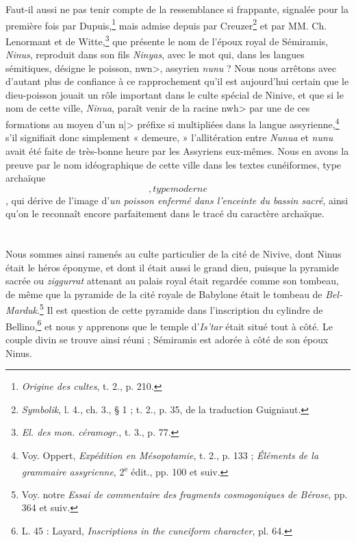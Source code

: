 \documentclass[a4paper, 11pt, oneside]{article}
\newcommand*\svgAAAA{}
\newcommand*\svgAAAB{}
\begin{document}
Faut-il aussi ne pas tenir compte de la ressemblance si frappante, signalée pour la première fois par Dupuis,\footnote{\emph{Origine des cultes}, t. 2., p. 210.} mais admise depuis par Creuzer\footnote{\emph{Symbolik}, l. 4., ch. 3., § 1 ; t. 2., p. 35, de la traduction Guigniaut.} et par MM. Ch. Lenormant et de Witte,\footnote{\emph{El. des mon. céramogr.}, t. 3., p. 77.} que présente le nom de l'époux royal de Sémiramis, \emph{Ninus}, reproduit dans son fils \emph{Ninyas}, avec le mot qui, dans les langues sémitiques, désigne le poisson, \<nwn>, assyrien \emph{nunu} ? Nous nous arrêtons avec d'autant plus de confiance à ce rapprochement qu'il est aujourd'hui certain que le dieu-poisson jouait un rôle important dans le culte spécial de Ninive, et que si le nom de cette ville, \emph{Ninua}, paraît venir de la racine \<nwh> par une de ces formations au moyen d'un \<n|> préfixe si multipliées dans la langue assyrienne,\footnote{Voy. Oppert, \emph{Expédition en Mésopotamie}, t. 2., p. 133 ; \emph{Éléments de la grammaire assyrienne}, 2\textsuperscript{e} édit., pp. 100 et suiv.} s'il signifiait donc simplement « demeure, » l'allitération entre \emph{Nunua} et \emph{nunu} avait été faite de très-bonne heure par les Assyriens eux-mêmes. Nous en avons la preuve par le nom idéographique de cette ville dans les textes cunéiformes, type archaïque $\svgAAAA$, type moderne $\svgAAAB$, qui dérive de l'image d'\emph{un poisson enfermé dans l'enceinte du bassin sacré}, ainsi qu'on le reconnaît encore parfaitement dans le tracé du caractère archaïque.

\bigskip \centerline{\EightStarTaper} \centerline{\EightStarTaper\EightStarTaper} \bigskip\clearpage
\section{}
\paragraph{}
Nous sommes ainsi ramenés au culte particulier de la cité de Nivive, dont Ninus était le héros éponyme, et dont il était aussi le grand dieu, puisque la pyramide sacrée ou \emph{ziggurrat} attenant au palais royal était regardée comme son tombeau, de même que la pyramide de la cité royale de Babylone était le tombeau de \emph{Bel-Marduk}.\footnote{Voy. notre \emph{Essai de commentaire des fragments cosmogoniques de Bérose}, pp. 364 et suiv.} Il est question de cette pyramide dans l'inscription du cylindre de Bellino,\footnote{L. 45 : Layard, \emph{Inscriptions in the cuneiform character}, pl. 64.} et nous y apprenons que le temple d'\emph{Is'tar} était situé tout à côté. Le couple divin se trouve ainsi réuni ; Sémiramis est adorée à côté de son époux Ninus.
\end{document}

